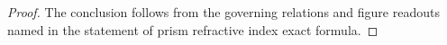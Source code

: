 \begin{proof}
  The conclusion follows from the governing relations and figure readouts named in the statement of prism refractive index exact formula.
\end{proof}
